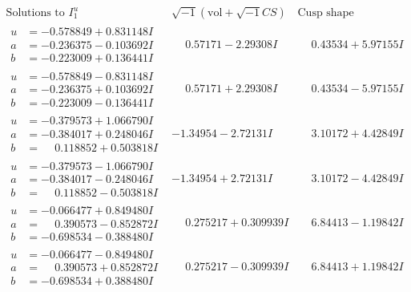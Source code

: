 \documentclass[1p]{elsarticle_modified}
\theoremstyle{definition}
\newcommand{\I}{\sqrt{-1}}
\begin{document}
$$\begin{array}{c|c|c}  
\text{Solutions to }I^u_{1}& \I (\text{vol} + \sqrt{-1}CS) & \text{Cusp shape}\\
 \hline 
\begin{aligned}
u &= -0.578849 + 0.831148 I \\
a &= -0.236375 - 0.103692 I \\
b &= -0.223009 + 0.136441 I\end{aligned}
 & \phantom{-}0.57171 - 2.29308 I & \phantom{-}0.43534 + 5.97155 I \\ \hline\begin{aligned}
u &= -0.578849 - 0.831148 I \\
a &= -0.236375 + 0.103692 I \\
b &= -0.223009 - 0.136441 I\end{aligned}
 & \phantom{-}0.57171 + 2.29308 I & \phantom{-}0.43534 - 5.97155 I \\ \hline\begin{aligned}
u &= -0.379573 + 1.066790 I \\
a &= -0.384017 + 0.248046 I \\
b &= \phantom{-}0.118852 + 0.503818 I\end{aligned}
 & -1.34954 - 2.72131 I & \phantom{-}3.10172 + 4.42849 I \\ \hline\begin{aligned}
u &= -0.379573 - 1.066790 I \\
a &= -0.384017 - 0.248046 I \\
b &= \phantom{-}0.118852 - 0.503818 I\end{aligned}
 & -1.34954 + 2.72131 I & \phantom{-}3.10172 - 4.42849 I \\ \hline\begin{aligned}
u &= -0.066477 + 0.849480 I \\
a &= \phantom{-}0.390573 - 0.852872 I \\
b &= -0.698534 - 0.388480 I\end{aligned}
 & \phantom{-}0.275217 + 0.309939 I & \phantom{-}6.84413 - 1.19842 I \\ \hline\begin{aligned}
u &= -0.066477 - 0.849480 I \\
a &= \phantom{-}0.390573 + 0.852872 I \\
b &= -0.698534 + 0.388480 I\end{aligned}
 & \phantom{-}0.275217 - 0.309939 I & \phantom{-}6.84413 + 1.19842 I \\ \hline\begin{aligned}

\end{aligned}
\end{array}$$
\end{document}
